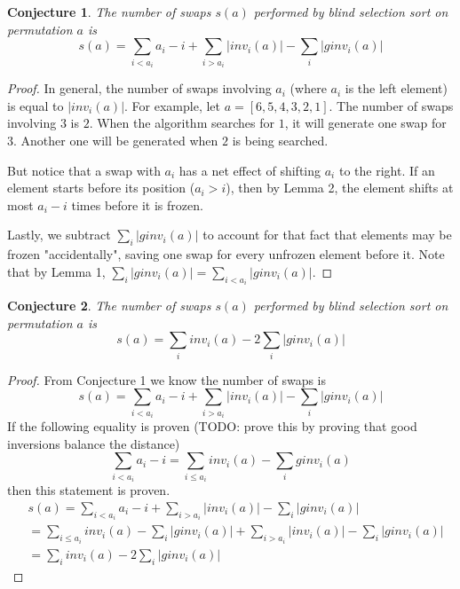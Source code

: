 \documentclass{article}
\newtheorem{conjecture}{Conjecture}
\begin{document}
\begin{conjecture}
    The number of swaps $s(a)$ performed by blind selection sort on permutation $a$ is
    \begin{equation}
        s(a) = \sum_{i < a_i} a_i - i + \sum_{i > a_i} \vert inv_i(a) \vert - \sum_{i} \vert ginv_i(a) \vert
    \end{equation}
\end{conjecture}
\begin{proof}
    In general, the number of swaps involving $a_i$ (where $a_i$ is the left element) is equal to $ \vert inv_i(a) \vert $.
    For example, let $a = [6, 5, 4, 3, 2, 1]$. The number of swaps involving $3$ is $2$.
    When the algorithm searches for $1$, it will generate one swap for $3$. Another one will be generated
    when $2$ is being searched.

    But notice that a swap with $a_i$ has a net effect
    of shifting $a_i$ to the right. If an element starts before its position ($a_i > i$), then by Lemma 2, the element shifts
    at most $a_i - i$ times before it is frozen.

    Lastly, we subtract $ \sum_{i} \vert ginv_i(a) \vert$ to account
    for that fact that elements may be frozen
    "accidentally", saving one swap for every unfrozen element before it. Note that by Lemma 1,
    $ \sum_{i} \vert ginv_i(a) \vert = \sum_{i < a_i} \vert ginv_i(a) \vert $.
\end{proof}

\begin{conjecture}
    The number of swaps $s(a)$ performed by blind selection sort on permutation $a$ is
    \begin{equation}
        s(a) = \sum_{i} inv_i(a) - 2 \sum_{i} \vert ginv_i(a) \vert
    \end{equation}
\end{conjecture}
\begin{proof}
    From Conjecture  1 we know the number of swaps is
    \begin{equation}
        s(a) = \sum_{i < a_i} a_i - i + \sum_{i > a_i} \vert inv_i(a) \vert - \sum_{i} \vert ginv_i(a) \vert
    \end{equation}
    If the following equality is proven (TODO: prove this by proving that good inversions balance the distance)
    \begin{equation}
        \sum_{i < a_i} a_i - i = \sum_{i \leq a_i} inv_i(a) - \sum_{i} ginv_i(a)
    \end{equation}
    then this statement is proven.
    \begin{align}
        &s(a) = \sum_{i < a_i} a_i - i + \sum_{i > a_i} \vert inv_i(a) \vert - \sum_{i} \vert ginv_i(a) \vert \\\nonumber
        &= \sum_{i \leq a_i} inv_i(a) - \sum_{i} \vert ginv_i(a) \vert + \sum_{i > a_i} \vert inv_i(a) \vert - \sum_{i} \vert ginv_i(a) \vert \\\nonumber
        &= \sum_{i} inv_i(a) - 2 \sum_{i} \vert ginv_i(a) \vert
    \end{align}
\end{proof}
\end{document}
